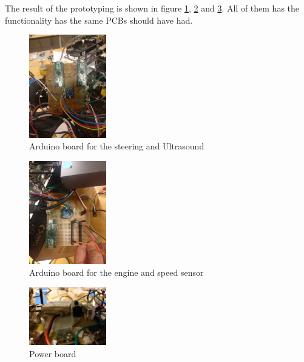 \documentclass[11pt, titlepage]{article} %
\begin{document}
The result of the prototyping is shown in figure \ref{fig:board_ultra_steering}, \ref{fig:board_speed_engine} and \ref{fig:power_board}. All of them has the functionality has the same PCBs should have had. 


\begin{figure}
	\centering
	\includegraphics[width=0.3\textwidth]{arduino1.jpg}
	\caption{Arduino board for the steering and Ultrasound}
	\label{fig:board_ultra_steering}
\end{figure}

\begin{figure}
	\centering
	\includegraphics[width=0.3\textwidth]{arduino2.jpg}
	\caption{Arduino board for the engine and speed sensor}
	\label{fig:board_speed_engine}
\end{figure}

\begin{figure}
	\centering
	\includegraphics[width=0.3\textwidth]{power_board.jpg}
	\caption{Power board}
	\label{fig:power_board}
\end{figure}



\end{document}
